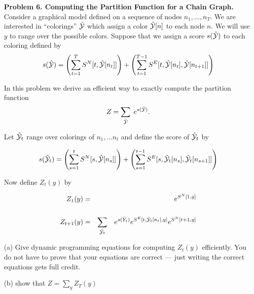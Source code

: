 \documentclass{article}
\newcommand{\solution}[1]{}
\begin{document}
\bigskip
{\bf Problem 6. Computing the Partition Function for a Chain Graph.}  Consider a graphical model defined on a sequence of nodes $n_1,\ldots,n_T$. We are
interested in ``colorings'' $\hat{\cal Y}$ which assign a color $\hat{\cal Y}[n]$ to each node $n$. We will use $y$ to range over the possible colors.  Suppose that we assign a score
$s(\hat{\cal Y})$ to each coloring defined by
$$s(\hat{\cal Y}) = \left(\sum_{t = 1}^T S^N[t,\hat{\cal Y}[n_t]]\right) + \left(\sum_{t = 1}^{T-1} S^E[t,\hat{\cal Y}[n_t],\hat{\cal Y}[n_{t+1}]]\right)$$

In this problem we derive an efficient way to exactly compute the partition function
$$Z = \sum_{\hat{\cal Y}}\;e^{s(\hat{\cal Y})}.$$

Let $\hat{\cal Y}_t$ range over colorings of $n_1,\ldots n_t$ and define the score of $\hat{{\cal Y}}_t$ by

$$s(\hat{\cal Y}_t) = \left(\sum_{s = 1}^t S^N[s,\hat{\cal Y}[n_s]]\right) + \left(\sum_{s = 1}^{t-1} S^E[s,\hat{\cal Y}_t[n_s],\hat{\cal Y}_t[n_{s+1}]]\right)$$

Now define $Z_t(y)$ by

\begin{eqnarray*}
  Z_1(y) & = & e^{S^N[1,y]} \\
  \\
  Z_{t+1}(y) & = & \sum_{\hat{\cal Y}_t}\;\;\;e^{s(\hat{Y}_t)}e^{S^E[t,\hat{\cal Y}_t[n_t],y]}e^{S^N[t+1,y]}
\end{eqnarray*}

\medskip
(a) Give dynamic programming equations for computing $Z_t(y)$ efficiently. You do not have to prove that your equations are correct --- just writing the correct equations gets full credit.

\solution{
  \begin{eqnarray*}
    Z_1(y) & = & e^{S^N[1,y]} \\
    \\
    Z_{t+1}(y) & = & e^{S^N[t+1,y]}\;\sum_{y'}\;\;\;Z_t(y')e^{S^E[t,y',y]}
  \end{eqnarray*}
}

\medskip
(b) show that $Z = \sum_y Z_T(y)$

\solution{
  \begin{eqnarray*}
    \sum_y Z_{T}(y) & = & \sum_y \sum_{\hat{\cal Y}_{T-1}}\;\;\;e^{s(\hat{Y}_{T-1})}e^{S^E[t,\hat{\cal Y}_t[n_t],y]}e^{S^N[t+1,y]} \\
    \\
    & = & \sum{y} \sum_{\hat{\cal Y}} e^{s(\hat{\cal Y}[n_T = y])} \\
    \\
    & = & \sum_{\hat{\cal Y}} e^{s(\hat{\cal Y})} \\
    \\
    & = & Z
  \end{eqnarray*}
}
\end{document}
